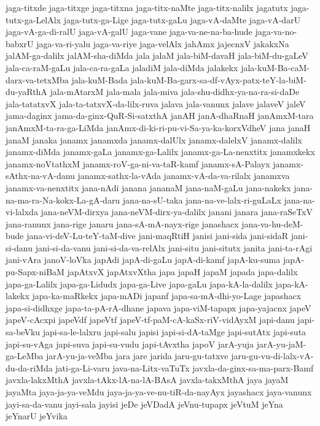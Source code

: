 {jaga-titxde
jaga-titxge
jaga-titxna
jaga-titx-naMte
jaga-titx-nalilx
jagatutx
jaga-tutx-ga-LelAlx
jaga-tutx-ga-Lige
jaga-tutx-gaLu
jaga-vA-daMte
jaga-vA-darU
jaga-vA-ga-di-ralU
jaga-vA-galU
jaga-vane
jaga-va-ne-na-ba-hude
jaga-va-no-babxrU
jaga-va-ri-yalu
jaga-va-riye
jaga-velAlx
jahAmx
jajecnxV
jakakxNa
jalAM-ga-dalilx
jalAM-sha-diMda
jala
jalaM
jala-biM-davaH
jala-biM-du-gaLeV
jala-ca-raM-gaLu
jala-ca-ra-gaLa
jaladiM
jala-diMda
jalakekx
jala-kuM-Ba-caM-darx-va-tetxMba
jala-kuM-Bada
jala-kuM-Ba-garx-sa-df-vAyx-patx-teY-la-biM-du-yaRthA
jala-mAtarxM
jala-mala
jala-miva
jala-shu-didhx-ya-na-ra-si-daDe
jala-tatatxvX
jala-ta-tatxvX-da-lilx-ruva
jalava
jala-vanunx
jalave
jalaveV
jaleV
jama-daginx
jama-da-ginx-QuR-Si-satxthA
janAH
janA-dhaRnaH
janAmxM-tara
janAmxM-ta-ra-ga-LiMda
janAmx-di-ki-ri-pu-vi-Sa-ya-ka-korxVdheV
jana
janaH
janaM
janaka
janamx
janamxda
janamx-dalUlx
janamx-dalelxV
janamx-dalilx
janamx-diMda
janamx-gaLa
janamx-ga-Lalilx
janamx-ga-La-nenxtitx
janamxkekx
janamx-noVtathxM
janamx-roV-ga-ni-va-taR-kamf
janamx-sA-Palayx
janamx-sAthx-na-vA-danu
janamx-sathx-la-vAda
janamx-vA-da-va-rilalx
janamxva
janamx-va-nenxtitx
jana-nAdi
janana
jananaM
jana-naM-gaLu
jana-nakekx
jana-na-ma-ra-Na-kokx-La-gA-daru
jana-na-sU-taka
jana-na-ve-lalx-ri-guLaLx
jana-na-vi-lalxda
jana-neVM-dirxya
jana-neVM-dirx-ya-dalilx
janani
janara
jana-raSeTxV
jana-ranunx
jana-rige
janaru
jana-sA-mA-nayx-rige
janashacx
jana-va-hu-deM-bude
jana-vi-deV-Lu-teY-taM-dive
jani-maqRtiH
janisi
jani-sida
jani-sidaR
jani-si-danu
jani-si-da-vanu
jani-si-da-va-relAlx
jani-situ
jani-situtx
janita
jani-ta-rAgi
jani-vAra
janoV-loVka
japAdi
japA-di-gaLu
japA-di-kamf
japA-ku-suma
japA-pu-Sapx-niBaM
japAtxvX
japAtxvXtha
japa
japaH
japaM
japada
japa-dalilx
japa-ga-Lalilx
japa-ga-Lidudx
japa-ga-Live
japa-gaLu
japa-kA-la-dalilx
japa-kA-lakekx
japa-ka-maRkekx
japa-mADi
japanf
japa-sa-mA-dhi-yo-Lage
japashacx
japa-si-didhxge
japa-ta-pA-rA-dhane
japava
japa-viM-tapapx
japa-yajacnx
japeV
japeV-cAcxpi
japeVdf
japeVtf
japeV-tf-paM-cA-kaSx-riV-vidAyxM
japi-danu
japi-sa-beVku
japi-sa-le-lalxru
japi-salu
japisi
japi-si-dA-taMge
japi-sutAtx
japi-suta
japi-su-vAga
japi-suva
japi-su-vudu
japi-tAvxtha
japoV
jarA-yuja
jarA-yu-jaM-ga-LeMba
jarA-yu-ja-veMba
jara
jare
jarida
jaru-gu-tatxve
jaru-gu-vu-di-lalx-vA-du-da-riMda
jati-ga-Li-varu
java-na-Litx-vaTuTx
javxla-da-ginx-sa-ma-parx-Bamf
javxla-lakxMthA
javxla-tAkx-lA-na-lA-BAsA
javxla-takxMthA
jaya
jayaM
jayaMta
jaya-ja-ya-veMdu
jaya-ja-ya-ve-nu-tiR-da-nayAyx
jayashacx
jaya-vanunx
jayi-sa-da-vanu
jayi-sala
jayisi
jeDe
jeVDadA
jeVnu-tupapx
jeVtuM
jeYna
jeYnarU
jeYvika
}

